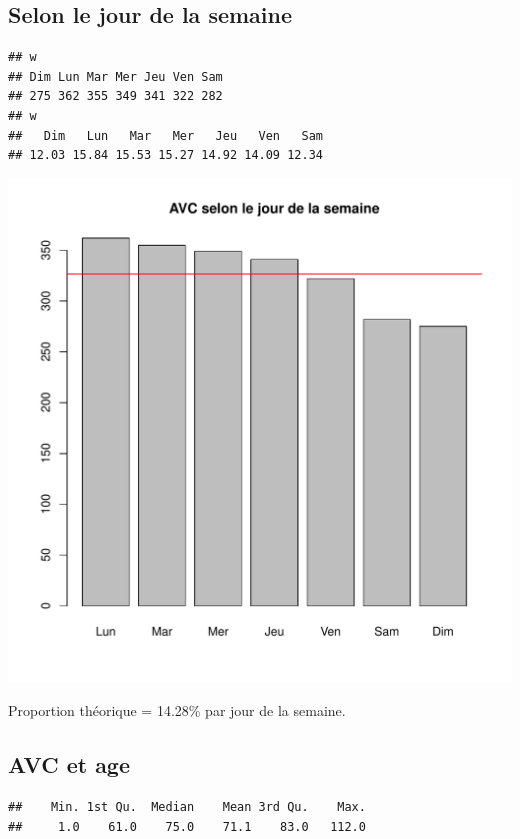 \documentclass[12pt,english,french,twoside]{report}\usepackage[]{graphicx}\usepackage[]{color}
\makeatletter
\def\maxwidth{ %
  \ifdim\Gin@nat@width>\linewidth
    \linewidth
  \else
    \Gin@nat@width
  \fi
}
\newenvironment{kframe}{%
 \def\at@end@of@kframe{}%
 \ifinner\ifhmode%
  \def\at@end@of@kframe{\end{minipage}}%
  \begin{minipage}{\columnwidth}%
 \fi\fi%
 \def\FrameCommand##1{\hskip\@totalleftmargin \hskip-\fboxsep
 \colorbox{shadecolor}{##1}\hskip-\fboxsep
     \hskip-\linewidth \hskip-\@totalleftmargin \hskip\columnwidth}%
 \MakeFramed {\advance\hsize-\width
   \@totalleftmargin\z@ \linewidth\hsize
   \@setminipage}}%
 {\par\unskip\endMakeFramed%
 \at@end@of@kframe}
\newenvironment{knitrout}{}{} %
\makeatother
\begin{document}
\subsection*{Selon le jour de la semaine}

\begin{knitrout}
\color{fgcolor}\begin{kframe}
\begin{verbatim}
## w
## Dim Lun Mar Mer Jeu Ven Sam 
## 275 362 355 349 341 322 282
## w
##   Dim   Lun   Mar   Mer   Jeu   Ven   Sam 
## 12.03 15.84 15.53 15.27 14.92 14.09 12.34
\end{verbatim}
\end{kframe}
\includegraphics[width=\maxwidth]{figure/avc_jour_semaine} 

\end{knitrout}

Proportion théorique = 14.28\% par jour de la semaine.

\subsection*{AVC et age}
\begin{knitrout}
\color{fgcolor}\begin{kframe}
\begin{verbatim}
##    Min. 1st Qu.  Median    Mean 3rd Qu.    Max. 
##     1.0    61.0    75.0    71.1    83.0   112.0
\end{verbatim}
\end{kframe}
\end{knitrout}
\end{document}
